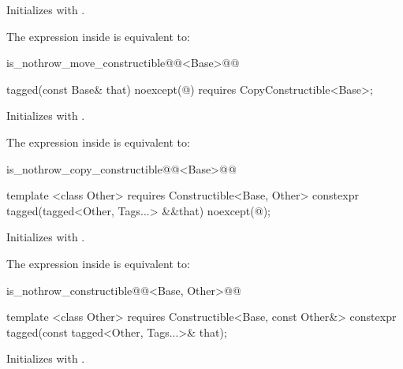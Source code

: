 {\begin{itemdescr}
\pnum
\effects Initializes  with .

\pnum
\remarks The expression inside  is equivalent to:

\begin{codeblock}
is_nothrow_move_constructible@@<Base>@@
\end{codeblock}
\end{itemdescr}

\begin{itemdecl}
tagged(const Base& that) noexcept(@\seebelow@)
  requires CopyConstructible<Base>;
\end{itemdecl}

\begin{itemdescr}
\pnum
\effects Initializes  with .

\pnum
\remarks The expression inside  is equivalent to:

\begin{codeblock}
is_nothrow_copy_constructible@@<Base>@@
\end{codeblock}
\end{itemdescr}

\begin{itemdecl}
template <class Other>
  requires Constructible<Base, Other>
constexpr tagged(tagged<Other, Tags...> &&that) noexcept(@\seebelow@);
\end{itemdecl}

\begin{itemdescr}
\pnum
\effects Initializes  with .

\pnum
\remarks The expression inside  is equivalent to:

\begin{codeblock}
is_nothrow_constructible@@<Base, Other>@@
\end{codeblock}
\end{itemdescr}

\begin{itemdecl}
template <class Other>
  requires Constructible<Base, const Other&>
constexpr tagged(const tagged<Other, Tags...>& that);
\end{itemdecl}

\begin{itemdescr}
\pnum
\effects Initializes  with .
\end{itemdescr}

}
